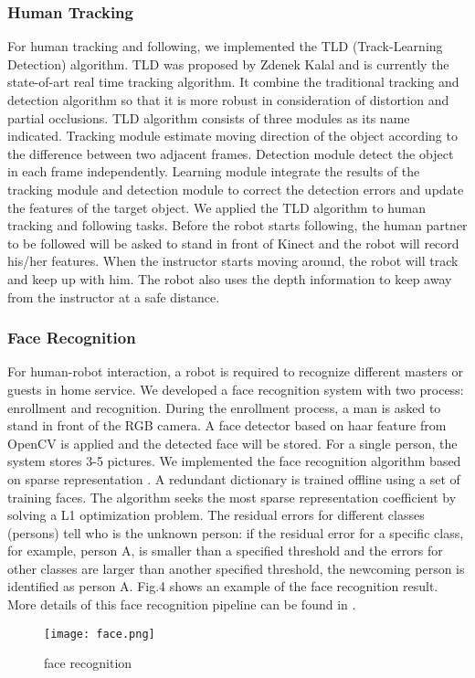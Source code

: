 \subsubsection{Human Tracking}
For human tracking and following, we implemented the TLD (Track-Learning Detection) algorithm\cite{kalal2012tracking}. TLD was proposed by Zdenek Kalal and is currently the state-of-art real time tracking algorithm. It combine the traditional tracking and detection algorithm so that it is more robust in consideration of distortion and partial occlusions. TLD algorithm consists of three modules as its name indicated. Tracking module estimate moving direction of the object according to the difference between two adjacent frames. Detection module detect the object in each frame independently. Learning module integrate the results of the tracking module and detection module to correct the detection errors and update the features of the target object.
We applied the TLD algorithm to human tracking and following tasks. Before the robot starts following, the human partner to be followed will be asked to stand in front of Kinect and the robot will record his/her features. When the instructor starts moving around, the robot will track and keep up with him. The robot also uses the depth information to keep away from the instructor at a safe distance.
\subsubsection{Face Recognition}
For human-robot interaction, a robot is required to recognize different masters or guests in home service. We developed a face recognition system with two process: enrollment and recognition. During the enrollment process, a man is asked to stand in front of the RGB camera. A face detector based on haar feature from OpenCV is applied and the detected face will be stored. For a single person, the system stores 3-5 pictures.
We implemented the face recognition algorithm based on sparse representation \cite{wright2009robust}. A redundant dictionary is trained offline using a set of training faces. The algorithm seeks the most sparse representation coefficient by solving a L1 optimization problem. The residual errors for different classes (persons) tell who is the unknown person: if the residual error for a specific class, for example, person A, is smaller than a specified threshold and the errors for other classes are larger than another specified threshold, the newcoming person is identified as person A. Fig.4 shows an example of the face recognition result. More details of this face recognition pipeline can be found in \cite{xia2015human}.
\begin{figure}[H]
	\centering
    \texttt{[image: face.png]}
    \caption{face recognition}
\end{figure}
